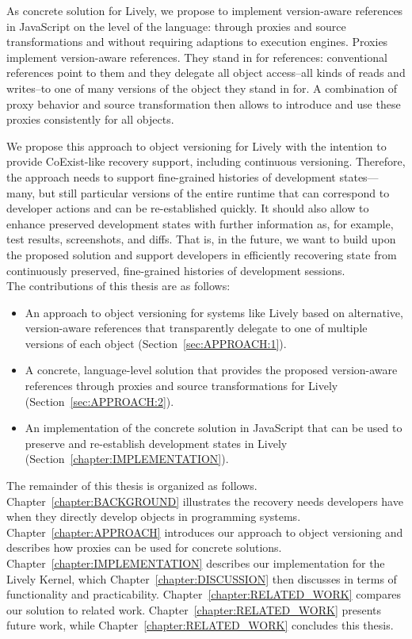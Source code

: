 As concrete solution for Lively, we propose to implement version-aware references in JavaScript on the level of the language: through proxies and source transformations and without requiring adaptions to execution engines.
Proxies implement version-aware references.
They stand in for references: conventional references point to them and they delegate all object access--all kinds of reads and writes--to one of many versions of the object they stand in for.
A combination of proxy behavior and source transformation then allows to introduce and use these proxies consistently for all objects.

We propose this approach to object versioning for Lively with the intention to provide CoExist-like recovery support, including continuous versioning.
Therefore, the approach needs to support fine-grained histories of development states---many, but still particular versions of the entire runtime that can correspond to developer actions and can be re-established quickly.
It should also allow to enhance preserved development states with further information as, for example, test results, screenshots, and diffs.
That is, in the future, we want to build upon the proposed solution and support developers in efficiently recovering state from continuously preserved, fine-grained histories of development sessions.\\

The contributions of this thesis are as follows:
\begin{itemize}
    \item An approach to object versioning for systems like Lively based on alternative, version-aware references that transparently delegate to one of multiple versions of each object (Section~\ref{sec:APPROACH:1}).
    \item A concrete, language-level solution that provides the proposed version-aware references through proxies and source transformations for Lively (Section~\ref{sec:APPROACH:2}).
    \item An implementation of the concrete solution in JavaScript that can be used to preserve and re-establish development states in Lively (Section~\ref{chapter:IMPLEMENTATION}).\\
\end{itemize}

The remainder of this thesis is organized as follows. 
Chapter~\ref{chapter:BACKGROUND} illustrates the recovery needs developers have when they directly develop objects in programming systems.
Chapter~\ref{chapter:APPROACH} introduces our approach to object versioning and describes how proxies can be used for concrete solutions.
Chapter~\ref{chapter:IMPLEMENTATION} describes our implementation for the Lively Kernel, which Chapter~\ref{chapter:DISCUSSION} then discusses in terms of functionality and practicability.
Chapter~\ref{chapter:RELATED_WORK} compares our solution to related work.
Chapter~\ref{chapter:RELATED_WORK} presents future work, while Chapter~\ref{chapter:RELATED_WORK} concludes this thesis.
